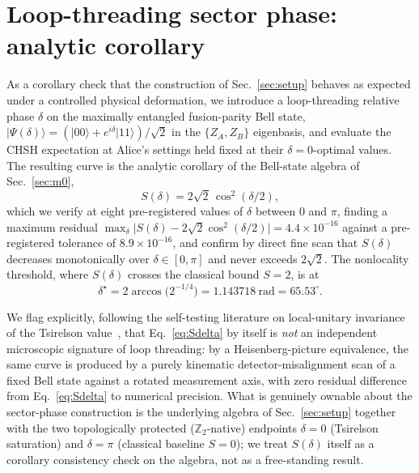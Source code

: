 \documentclass[aps,pra,twocolumn,superscriptaddress,floatfix,nofootinbib]{revtex4-2}
\providecommand{\ket}[1]{\lvert #1 \rangle}
\begin{document}
\section{Loop-threading sector phase: analytic corollary}
\label{sec:m5}

As a corollary check that the construction of Sec.~\ref{sec:setup}
behaves as expected under a controlled physical deformation, we
introduce a loop-threading relative phase $\delta$ on the maximally
entangled fusion-parity Bell state,
$\ket{\Psi(\delta)}=(\ket{00}+e^{i\delta}\ket{11})/\sqrt2$ in the
$\{Z_A,Z_B\}$ eigenbasis, and evaluate the CHSH expectation at Alice's
settings held fixed at their $\delta=0$-optimal values. The resulting
curve is the analytic corollary of the Bell-state algebra of
Sec.~\ref{sec:m0},
\begin{equation}
\label{eq:Sdelta}
S(\delta) = 2\sqrt2\,\cos^2(\delta/2),
\end{equation}
which we verify at eight pre-registered values of $\delta$ between $0$
and $\pi$, finding a maximum residual
$\max_\delta\lvert S(\delta)-2\sqrt2\cos^2(\delta/2)\rvert=4.4\times10^{-16}$
against a pre-registered tolerance of $8.9\times10^{-16}$, and confirm
by direct fine scan that $S(\delta)$ decreases monotonically over
$\delta\in[0,\pi]$ and never exceeds $2\sqrt2$. The nonlocality
threshold, where $S(\delta)$ crosses the classical bound $S=2$, is at
\begin{equation}
\delta^\star = 2\arccos\bigl(2^{-1/4}\bigr) = 1.143718\ \mathrm{rad} = 65.53^\circ.
\end{equation}

We flag explicitly, following the self-testing literature on
local-unitary invariance of the Tsirelson
value~\cite{SupicBowles2020}, that Eq.~\eqref{eq:Sdelta} by itself is
\emph{not} an independent microscopic signature of loop threading: by
a Heisenberg-picture equivalence, the same curve is produced by a
purely kinematic detector-misalignment scan of a fixed Bell state
against a rotated measurement axis, with zero residual difference from
Eq.~\eqref{eq:Sdelta} to numerical precision. What is genuinely ownable
about the sector-phase construction is the underlying algebra of
Sec.~\ref{sec:setup} together with the two topologically protected
($\mathbb{Z}_2$-native) endpoints $\delta=0$ (Tsirelson saturation) and
$\delta=\pi$ (classical baseline $S=0$); we treat $S(\delta)$ itself as
a corollary consistency check on the algebra, not as a free-standing
result.
\end{document}
